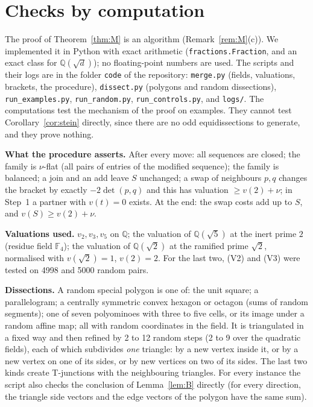 \documentclass[11pt]{article}
\theoremstyle{definition}
\newcommand{\Q}{\mathbb{Q}}
\newcommand{\F}{\mathbb{F}}
\newcommand{\tL}[1]{\texttt{#1}}
\begin{document}
\section{Checks by computation}\label{sec:comp}

The proof of Theorem~\ref{thm:M} is an algorithm (Remark~\ref{rem:M}(c)). We implemented it in
Python with exact arithmetic (\tL{fractions.Fraction}, and an exact class for $\Q(\sqrt d)$); no
floating-point numbers are used. The scripts and their logs are in the folder \tL{code} of the
repository: \tL{merge.py} (fields, valuations, brackets, the procedure), \tL{dissect.py} (polygons
and random dissections), \tL{run\_examples.py}, \tL{run\_random.py}, \tL{run\_controls.py}, and
\tL{logs/}. The computations test the mechanism of the proof on examples. They cannot test
Corollary~\ref{cor:stein} directly, since there are no odd equidissections to generate, and they
prove nothing.

\textbf{What the procedure asserts.} After every move: all sequences are closed; the family is
$\nu$-flat (all pairs of entries of the modified sequence); the family is balanced; a join and an
add leave $S$ unchanged; a swap of neighbours $p,q$ changes the bracket by exactly $-2\det(p,q)$ and
this has valuation $\ge v(2)+\nu$; in Step~1 a partner with $v(t)=0$ exists. At the end: the swap
costs add up to $S$, and $v(S)\ge v(2)+\nu$.

\textbf{Valuations used.} $v_2,v_3,v_5$ on $\Q$; the valuation of $\Q(\sqrt5)$ at the inert prime
$2$ (residue field $\F_4$); the valuation of $\Q(\sqrt2)$ at the ramified prime $\sqrt2$, normalised
with $v(\sqrt2)=1$, $v(2)=2$. For the last two, (V2) and (V3) were tested on 4998 and 5000 random pairs.

\textbf{Dissections.} A random special polygon is one of: the unit square; a parallelogram; a
centrally symmetric convex hexagon or octagon (sums of random segments); one of seven polyominoes
with three to five cells, or its image under a random affine map; all with random coordinates in
the field. It is triangulated in a fixed way and then refined by 2 to 12 random steps (2 to 9 over
the quadratic fields), each of which subdivides \emph{one} triangle: by a new vertex inside it, or
by a new vertex on one of its sides, or by new vertices on two of its sides. The last two kinds
create T-junctions with the neighbouring triangles. For every instance the script also checks the
conclusion of Lemma~\ref{lem:B} directly (for every direction, the triangle side vectors and the
edge vectors of the polygon have the same sum).
\end{document}
